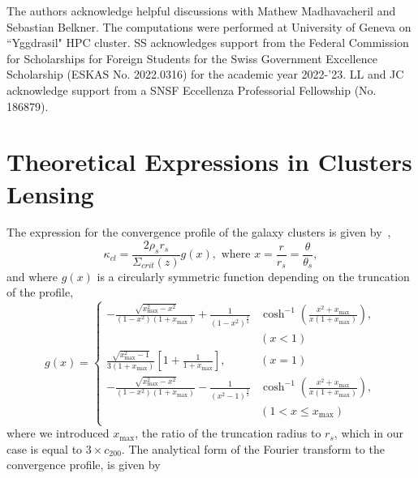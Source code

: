 \documentclass[prd, superscriptaddress, tightenlines, longbibliography, nofootinbib, eqsecnum, amsfonts, amsmath, floatfix, twocolumn, notitlepage]{revtex4-2}
\begin{document}
\begin{acknowledgements}
The authors acknowledge helpful discussions with Mathew Madhavacheril and Sebastian Belkner. The computations were performed at University of Geneva on ``Yggdrasil" HPC cluster. SS acknowledges support from the Federal Commission for Scholarships for Foreign Students for the Swiss Government Excellence Scholarship (ESKAS No. 2022.0316) for the academic year 2022-'23. LL and JC acknowledge support from a SNSF Eccellenza Professorial Fellowship (No. 186879).

\end{acknowledgements}

\appendix
\section{Theoretical Expressions in Clusters Lensing}\label{A2}
The expression for the convergence profile of the galaxy clusters is given by~\cite{Takada:2002qq},
\begin{equation}
    \kappa_{cl} = \frac{2\rho_s r_s}{\Sigma_{crit}(z)}g(x), \text{ where } x=\frac{r}{r_s} = \frac{\theta}{\theta_s},
\end{equation}
and where $g(x)$ is a circularly symmetric function depending on the truncation of the profile,
\begin{equation}
    g(x) = 
     \begin{cases}
       -\frac{\sqrt{x_{\text{max}}^2-x^2}}{(1-x^2)(1+x_{\text{max}})} + \frac{1}{(1-x^2)^{\frac{3}{2}}}&\cosh^{-1}\left(\frac{x^2+x_{\text{max}}}{x(1+x_{\text{max}})}\right),  \\ &(x < 1)\\
       \frac{\sqrt{x_{\text{max}}^2 - 1}}{3(1+x_{\text{max}})}\left[ 1+\frac{1}{1+x_{\text{max}}} \right],  &(x = 1)\\
       -\frac{\sqrt{x_{\text{max}}^2-x^2}}{(1-x^2)(1+x_{\text{max}})} - \frac{1}{(x^2-1)^{\frac{3}{2}}}&\cosh^{-1}\left(\frac{x^2+x_{\text{max}}}{x(1+x_{\text{max}})}\right),  \\
       &(1< x \leq x_{\text{max}})\\
     \end{cases}
\end{equation}
where we introduced $x_{\text{max}}$, the ratio of the truncation radius to $r_s$, which in our case is equal to $3\times c_{200}$. 
The analytical form of the Fourier transform to the convergence profile, is given by \cite{Scoccimarro:2000gm, 2011PhRvD..83b3008O, Takada:2002qq}%
\end{document}
